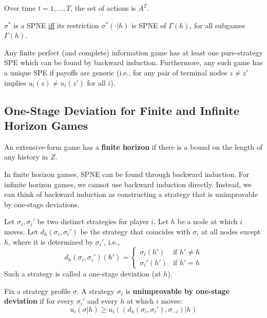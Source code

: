 \documentclass[11pt]{elegantbook_2}
\begin{document}
Over time $t=1,...,T$, the set of actions is $A^T$.

\begin{lemma}
    $\sigma^*$ is a SPNE \underline{iff} its restriction $\sigma^*(\cdot|h)$ is SPNE of $\Gamma(h)$, for all subgames $\Gamma(h)$.
\end{lemma}

\begin{theorem}
Any finite perfect (and complete) information game has at least one pure-strategy SPE which can be found by backward induction. Furthermore, any such game has a unique SPE if payoffs are generic (i.e., for any pair of terminal nodes $z \neq z'$ implies $u_i(z) \neq u_i(z')$ for all $i$).
\end{theorem}

\subsection{One-Stage Deviation for Finite and Infinite Horizon Games}
\begin{definition}
    An extensive-form game has a \textbf{finite horizon} if there is a bound on the length of any history in $Z$.
\end{definition}

In finite horizon games, SPNE can be found through backward induction. For infinite horizon games, we cannot use backward induction directly. Instead, we can think of backward induction as constructing a strategy that is unimprovable by one-stage deviations.

\begin{definition}
Let $\sigma_i, \sigma_i'$ be two distinct strategies for player $i$. Let $h$ be a node at which $i$ moves. Let $d_h(\sigma_i,\sigma_i')$ be the strategy that coincides with $\sigma_i$ at all nodes except $h$, where it is determined by $\sigma_i'$, i.e.,
$$d_h(\sigma_i,\sigma_i')(h') = \begin{cases}
\sigma_i(h') & \text{if } h' \neq h\\
\sigma_i'(h') & \text{if } h' = h
\end{cases}$$
Such a strategy is called a one-stage deviation (at $h$).
\end{definition}

\begin{definition}
Fix a strategy profile $\sigma$. A strategy $\sigma_i$ is \textbf{unimprovable by one-stage deviation} if for every $\sigma_i'$ and every $h$ at which $i$ moves:
$$u_i(\sigma|h) \geq u_i((d_h(\sigma_i,\sigma_i'),\sigma_{-i})|h)$$
\end{definition}
\end{document}
